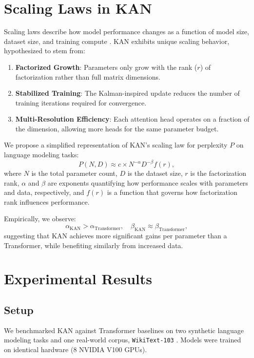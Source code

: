 \documentclass{article}
\begin{document}
\section{Scaling Laws in KAN}
\label{sec:scaling_laws}

Scaling laws describe how model performance changes as a function of model size, dataset size, and training compute \citep{kaplan2020scaling}. KAN exhibits unique scaling behavior, hypothesized to stem from:
\begin{enumerate}
    \item \textbf{Factorized Growth}: Parameters only grow with the rank ($r$) of factorization rather than full matrix dimensions.
    \item \textbf{Stabilized Training}: The Kalman-inspired update reduces the number of training iterations required for convergence.
    \item \textbf{Multi-Resolution Efficiency}: Each attention head operates on a fraction of the dimension, allowing more heads for the same parameter budget.
\end{enumerate}

We propose a simplified representation of KAN's scaling law for perplexity $P$ on language modeling tasks:
\begin{equation}
    P(N, D) \approx c \times N^{-\alpha} D^{-\beta} f(r),
\end{equation}
where $N$ is the total parameter count, $D$ is the dataset size, $r$ is the factorization rank, $\alpha$ and $\beta$ are exponents quantifying how performance scales with parameters and data, respectively, and $f(r)$ is a function that governs how factorization rank influences performance.

Empirically, we observe:
\begin{equation}
    \alpha_{\text{KAN}} > \alpha_{\text{Transformer}}, \quad
    \beta_{\text{KAN}} \approx \beta_{\text{Transformer}},
\end{equation}
suggesting that KAN achieves more significant gains per parameter than a Transformer, while benefiting similarly from increased data.

\section{Experimental Results}
\label{sec:experiments}

\subsection{Setup}
We benchmarked KAN against Transformer baselines on two synthetic language modeling tasks and one real-world corpus, \texttt{WikiText-103} \citep{merity2016pointer}. Models were trained on identical hardware (8 NVIDIA V100 GPUs).
\end{document}
